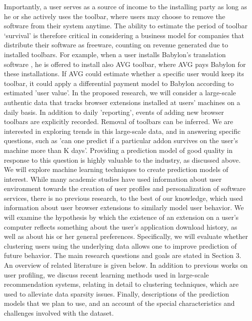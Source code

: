 \documentclass[ijoc,nonblindrev]{informs3} %
\numberwithin{equation}{subsection}
\begin{document}
Importantly, a user serves as a source of income to the installing party as long as he or she actively uses the toolbar, where users may choose to remove the software from their system anytime. The ability to estimate the period of toolbar ‘survival’ is therefore critical in considering a business model for companies that distribute their software as freeware, counting on revenue generated due to installed toolbars. For example, when a user installs Babylon's translation software , he is offered to install also AVG toolbar, where AVG pays Babylon for these installations. If AVG could estimate whether a specific user would keep its toolbar, it could apply a differential payment model to Babylon according to estimated 'user value'.  In the proposed research, we will consider a large-scale authentic data that tracks browser extensions installed at users' machines on a daily basis. In addition to daily 'reporting', events of adding new browser toolbars are explicitly recorded. Removal of toolbars can be inferred. We are interested in exploring trends in this large-scale data, and in answering specific questions, such as 'can one predict if a particular addon survives on the user's machine more than K days'. Providing a prediction model of good quality in response to this question is highly valuable to the industry, as discussed above. We will explore machine learning techniques to create prediction models of interest. While many academic studies have used information about user environment towards the creation of user
profiles and personalization of software services, there is no previous research, to the best of our knowledge, which used information about user browser extensions to similarly model user behavior. We will examine the hypothesis by which the existence of an extension on a user’s computer reflects something about the user's
application download history, as well as about his or her general preferences. Specifically, we will evaluate whether clustering users using the underlying data allows one to improve prediction of future behavior. The main research questions and goals are stated in Section 3. An overview of related literature is given below. In addition to previous works on user profiling, we discuss recent learning methods used in large-scale recommendation systems, relating in detail to clustering techniques, which are used to alleviate data sparsity
issues. Finally, descriptions of the prediction models that we plan to use, and an account of the special characteristics and challenges involved with the dataset.
\fi
\end{document}
